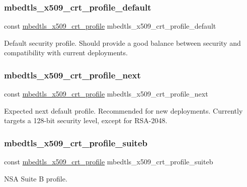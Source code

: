 \subsubsection{\texorpdfstring{mbedtls\+\_\+x509\+\_\+crt\+\_\+profile\+\_\+default}{mbedtls\_x509\_crt\_profile\_default}}
{\footnotesize\ttfamily const \hyperlink{structmbedtls__x509__crt__profile}{mbedtls\+\_\+x509\+\_\+crt\+\_\+profile} mbedtls\+\_\+x509\+\_\+crt\+\_\+profile\+\_\+default}

Default security profile. Should provide a good balance between security and compatibility with current deployments. \mbox{\label{group__x509__module_ga8ab1f8a044fd25f76ecb4ba15c6d5bcd}} 
\subsubsection{\texorpdfstring{mbedtls\+\_\+x509\+\_\+crt\+\_\+profile\+\_\+next}{mbedtls\_x509\_crt\_profile\_next}}
{\footnotesize\ttfamily const \hyperlink{structmbedtls__x509__crt__profile}{mbedtls\+\_\+x509\+\_\+crt\+\_\+profile} mbedtls\+\_\+x509\+\_\+crt\+\_\+profile\+\_\+next}

Expected next default profile. Recommended for new deployments. Currently targets a 128-\/bit security level, except for R\+S\+A-\/2048. \mbox{\label{group__x509__module_gaf09067a39129236125e353a68ceb45d6}} 
\subsubsection{\texorpdfstring{mbedtls\+\_\+x509\+\_\+crt\+\_\+profile\+\_\+suiteb}{mbedtls\_x509\_crt\_profile\_suiteb}}
{\footnotesize\ttfamily const \hyperlink{structmbedtls__x509__crt__profile}{mbedtls\+\_\+x509\+\_\+crt\+\_\+profile} mbedtls\+\_\+x509\+\_\+crt\+\_\+profile\+\_\+suiteb}

N\+SA Suite B profile. 